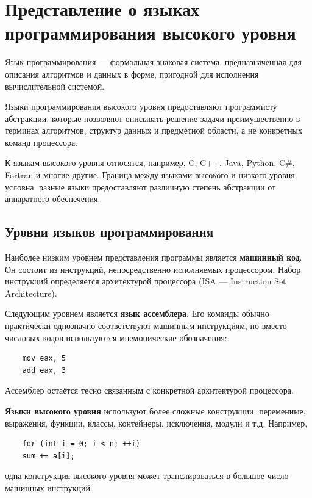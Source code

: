 \section{Представление о языках программирования высокого уровня}

Язык программирования --- формальная знаковая система, предназначенная для
описания алгоритмов и данных в форме, пригодной для исполнения вычислительной
системой.

Языки программирования высокого уровня предоставляют программисту абстракции,
которые позволяют описывать решение задачи преимущественно в терминах
алгоритмов, структур данных и предметной области, а не конкретных команд
процессора.

К языкам высокого уровня относятся, например, C, C++, Java, Python, C\#,
Fortran и многие другие. Граница между языками высокого и низкого уровня
условна: разные языки предоставляют различную степень абстракции от
аппаратного обеспечения.

\subsection{Уровни языков программирования}

Наиболее низким уровнем представления программы является
\textbf{машинный код}. Он состоит из инструкций, непосредственно исполняемых
процессором. Набор инструкций определяется архитектурой процессора
(ISA --- Instruction Set Architecture).

Следующим уровнем является \textbf{язык ассемблера}. Его команды обычно
практически однозначно соответствуют машинным инструкциям, но вместо числовых
кодов используются мнемонические обозначения:

\begin{verbatim}
	mov eax, 5
	add eax, 3
\end{verbatim}

Ассемблер остаётся тесно связанным с конкретной архитектурой процессора.

\textbf{Языки высокого уровня} используют более сложные конструкции:
переменные, выражения, функции, классы, контейнеры, исключения, модули и т.д.
Например,

\begin{verbatim}
	for (int i = 0; i < n; ++i)
	sum += a[i];
\end{verbatim}

одна конструкция высокого уровня может транслироваться в большое число
машинных инструкций.

